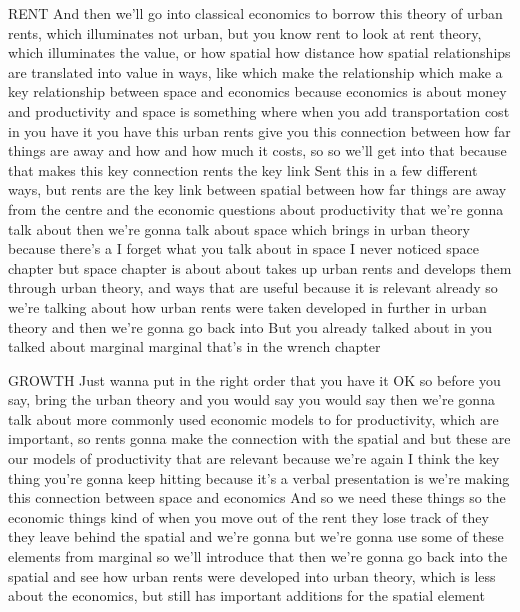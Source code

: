 RENT
And then we’ll go into classical economics to borrow this theory of urban rents, which illuminates not urban, but you know rent to look at rent theory, which illuminates the value, or how spatial how distance how spatial relationships are translated into value in ways, like which make the relationship which make a key relationship between space and economics because economics is about money and productivity and space is something where when you add transportation cost in you have it you have this urban rents give you this connection between how far things are away and how and how much it costs, so so we’ll get into that because that makes this key connection rents the key link Sent this in a few different ways, but rents are the key link between spatial between how far things are away from the centre and the economic questions about productivity that we’re gonna talk about then we’re gonna talk about space which brings in urban theory because there’s a I forget what you talk about in space I never noticed space chapter but space chapter is about about takes up urban rents and develops them through urban theory, and ways that are useful because it is relevant already so we’re talking about how urban rents were taken developed in further in urban theory and then we’re gonna go back into But you already talked about in you talked about marginal marginal that’s in the wrench chapter

GROWTH
Just wanna put in the right order that you have it OK so before you say, bring the urban theory and you would say you would say then we’re gonna talk about more commonly used economic models to for productivity, which are important, so rents gonna make the connection with the spatial and but these are our models of productivity that are relevant because we’re again I think the key thing you’re gonna keep hitting because it’s a verbal presentation is we’re making this connection between space and economics And so we need these things so the economic things kind of when you move out of the rent they lose track of they they leave behind the spatial and we’re gonna but we’re gonna use some of these elements from marginal so we’ll introduce that then we’re gonna go back into the spatial and see how urban rents were developed into urban theory, which is less about the economics, but still has important additions for the spatial element


